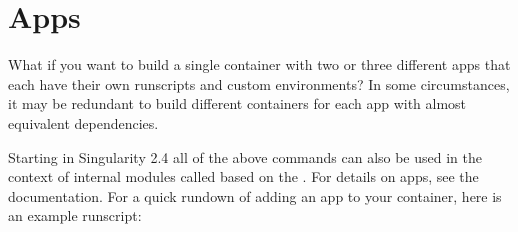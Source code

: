 \documentclass[letterpaper,10pt,english]{sphinxmanual}
\begin{document}
\section{Apps}
\label{\detokenize{container_recipes:apps}}
What if you want to build a single container with two or three
different apps that each have their own runscripts and custom
environments? In some circumstances, it may be redundant to build
different containers for each app with almost equivalent dependencies.

Starting in Singularity 2.4 all of the above commands can also be used
in the context of internal modules called {\hyperref[\detokenize{reproducible_scif_apps:reproducible-scif-apps}]{}} based on the . For details on apps, see the {\hyperref[\detokenize{reproducible_scif_apps:reproducible-scif-apps}]{}}
documentation. For a quick rundown of adding an app to your container,
here is an example runscript:
\end{document}
